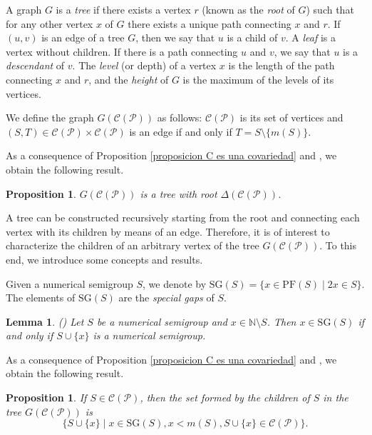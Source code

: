 \documentclass[11pt]{article}
\def\N{\mathbb{N}}
\newtheorem{proposition}[theorem]{Proposition}
\newtheorem{lemma}[theorem]{Lemma}
\numberwithin{equation}{section}
\begin{document}
A graph $G$ is a \textit{tree} if there exists a vertex $r$ (known as the \textit{root} of $G$) such that for any other vertex $x$ of $G$ there exists a unique path connecting $x$ and $r$. If $(u,v)$ is an edge of a tree $G$, then we say that $u$ is a child of $v$. A \textit{leaf} is a vertex without children. If there is a path connecting $u$ and $v$, we say that $u$ is a \textit{descendant} of $v$. The \textit{level} (or depth) of a vertex $x$ is the length of the path connecting $x$ and $r$, and the \textit{height} of $G$ is the maximum of the levels of its vertices.

We define the graph $G(\mathcal C(\mathcal P))$ as follows: $\mathcal C(\mathcal P)$ is its set of vertices and $(S,T)\in\mathcal C(\mathcal P)\times\mathcal C(\mathcal P)$ is an edge if and only if $T=S\setminus\{m(S)\}$.

As a consequence of Proposition \ref{proposicion C es una covariedad} and \cite[Proposition 2.3]{covariedades}, we obtain the following result.

\begin{proposition}
    $G(\mathcal C(\mathcal P))$ is a tree with root $\Delta(\mathcal C(\mathcal P))$.
\end{proposition}

A tree can be constructed recursively starting from the root and connecting each vertex with its children by means of an edge. Therefore, it is of interest to characterize the children of an arbitrary vertex of the tree $G(\mathcal C(\mathcal P))$. To this end, we introduce some concepts and results.

Given a numerical semigroup $S$, we denote by $\mathrm{SG}(S)=\{x\in\mathrm{PF}(S) \mid 2x\in S\}$. The elements of $\mathrm{SG}(S)$ are the \textit{special gaps} of $S$.

\begin{lemma}(\cite[Proposition 4.33]{libro})
    Let $S$ be a numerical semigroup and $x\in\N\setminus S$. Then $x\in\mathrm{SG}(S)$ if and only if $S\cup\{x\}$ is a numerical semigroup.
\end{lemma}

As a consequence of Proposition \ref{proposicion C es una covariedad} and \cite[Proposition 2.4]{covariedades}, we obtain the following result.

\begin{proposition}\label{proposicion hijos arbol}
    If $S\in\mathcal C(\mathcal P)$, then the set formed by the children of $S$ in the tree $G(\mathcal C(\mathcal P))$ is $$\{S\cup\{x\} \mid x\in\mathrm{SG}(S), x<m(S), S\cup\{x\}\in\mathcal{ C(\mathcal P)}\}.$$
\end{proposition}
\end{document}
